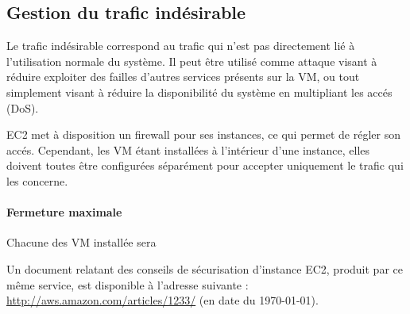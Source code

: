 \subsection{Gestion du trafic indésirable}

Le trafic indésirable correspond au trafic qui n'est pas directement lié à
l'utilisation normale du système. Il peut être utilisé comme attaque visant à
réduire exploiter des failles d'autres services présents sur la VM, ou tout
simplement visant à réduire la disponibilité du système en multipliant les
accés (DoS).

EC2 met à disposition un firewall pour ses instances, ce qui permet de régler
son accés. Cependant, les VM étant installées à l'intérieur d'une instance,
elles doivent toutes être configurées séparément pour accepter uniquement le
trafic qui les concerne.

\begin{description}
    \item[] 
\end{description}

\paragraph{Fermeture maximale}

Chacune des VM installée sera 

Un document relatant des conseils de sécurisation d'instance EC2, produit par
ce même service, est disponible à l'adresse suivante :
\url{http://aws.amazon.com/articles/1233/} (en date du \today).


